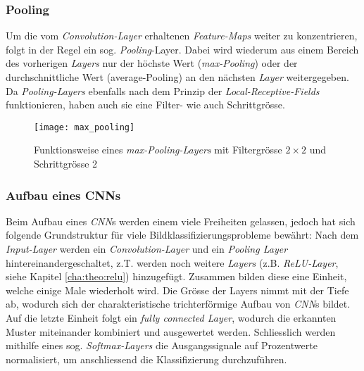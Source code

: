 \subsubsection{Pooling}
Um die vom \textit{Convolution-Layer} erhaltenen \textit{Feature-Maps} weiter zu konzentrieren, folgt in der Regel ein sog. \textit{Pooling}-Layer. Dabei wird wiederum aus einem Bereich des vorherigen \textit{Layers} nur der höchste Wert (\textit{max-Pooling}) oder der durchschnittliche Wert (average-Pooling) an den nächsten \textit{Layer} weitergegeben. Da \textit{Pooling-Layers} ebenfalls nach dem Prinzip der \textit{Local-Receptive-Fields} funktionieren, haben auch sie eine Filter- wie auch Schrittgrösse.

\begin{figure}[h]
	\centering
	\texttt{[image: max\_pooling]}
	\caption[\textit{\textit{max-Pooling-Layer}}]{Funktionsweise eines \textit{max-Pooling-Layers} mit Filtergrösse $2\times 2$ und Schrittgrösse 2}
	\label{img:max_pooling}
\end{figure}


\subsubsection{Aufbau eines CNNs}

Beim Aufbau eines \textit{CNN}s werden einem viele Freiheiten gelassen, jedoch hat sich folgende Grundstruktur für viele Bildklassifizierungsprobleme bewährt: Nach dem \textit{Input-Layer} werden ein \textit{Convolution-Layer} und ein \textit{Pooling Layer} hintereinandergeschaltet, z.T. werden noch weitere \textit{Layers} (z.B. \textit{ReLU-Layer}, siehe Kapitel \ref{cha:theo:relu}) hinzugefügt. Zusammen bilden diese eine Einheit, welche einige Male wiederholt wird. Die Grösse der Layers nimmt mit der Tiefe ab, wodurch sich der charakteristische trichterförmige Aufbau von \textit{CNN}s bildet. Auf die letzte Einheit folgt ein \textit{fully connected Layer}, wodurch die erkannten Muster miteinander kombiniert und ausgewertet werden. Schliesslich werden mithilfe eines sog. \textit{Softmax-Layers} die Ausgangssignale auf Prozentwerte normalisiert, um anschliessend die Klassifizierung durchzuführen.


